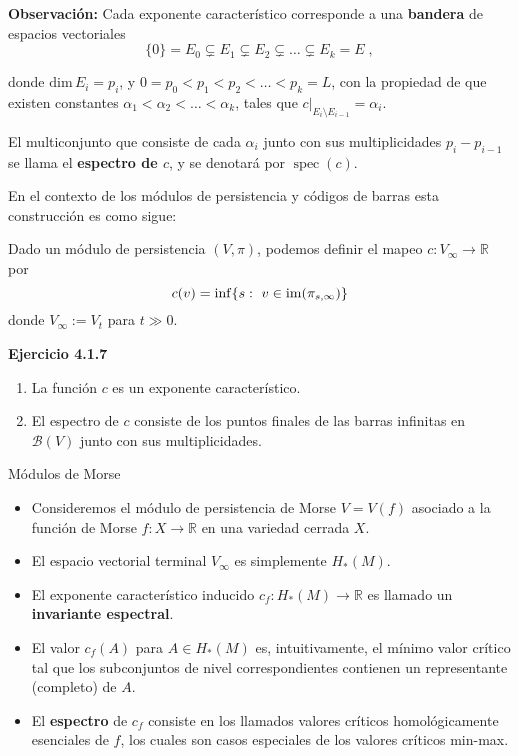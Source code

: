 \documentclass{beamer}
\newcounter{Ejercicio}
\DeclareMathOperator{\spec}{spec}
\newcommand{\calB}{{\mathcal{B}}}
\newcommand{\setm}{\setminus}
\newcommand{\restr}{\big|}  %
\def\R{\mathbb{R}}
\def \dim{{\mbox {dim}}\,}
\begin{document}
\begin{frame}{}
 \textbf{{\color{yellow}Observación:}}   Cada exponente característico corresponde a una \textbf{{\color{green}bandera}} de espacios vectoriales
$$
	\{0\} = E_0 \subsetneq E_1 \subsetneq E_2 \subsetneq \ldots \subsetneq E_k = E \;,
$$

donde $\dim E_i = p_i$, y $0= p_0 <p_1 < p_2 <\ldots < p_k = L$, con la propiedad de que existen constantes $\alpha_1 < \alpha_2 < \ldots < \alpha_k$, tales que 
$c\restr_{E_i\setm E_{i-1}} = \alpha_i$. \\[0.5cm]\pause

El multiconjunto que consiste de cada $\alpha_i$ junto con sus multiplicidades $p_i - p_{i-1}$ se llama el \textbf{{\color{green}espectro de $c$}}, y se denotará por $\spec (c)$.

\end{frame}

\begin{frame}{}

En el contexto de los módulos de persistencia y códigos de barras esta construcción es como sigue: \pause

Dado un módulo de persistencia $(V, \pi)$, podemos definir el mapeo $c: V_{\infty} \to \R$ por
	$$c(v) = \inf \{ s:\ v\in {\operatorname{im}}(\pi_{s, \infty})\}$$
donde $V_\infty := V_t$ para $t \gg 0$.\\[0.5cm] \pause

\textbf{{\color{violet}Ejercicio 4.1.7}}
	\begin{enumerate}
		\item
			La función $c$ es un exponente característico.
		\item
			El espectro de $c$ consiste de los puntos finales de las barras infinitas en $\calB (V)$ junto con sus multiplicidades.
	\end{enumerate}
\end{frame}

\begin{frame}{Módulos de Morse}
\begin{itemize}
    \item Consideremos el módulo de persistencia de Morse $V=V(f)$ asociado a la función de Morse $f : X \to \R$ en una variedad cerrada $X$. \\[0.5cm] \pause
    \item El espacio vectorial terminal $V_\infty$ es simplemente $H_*(M)$. \pause 
    \item El exponente característico inducido $c_f \colon H_*(M) \to \R$ es llamado un \textbf{{\color{green}invariante espectral}}. \\[0.5cm]\pause
    \item El valor $c_f(A)$ para $A \in H_*(M)$ es, intuitivamente, el mínimo valor crítico tal que los subconjuntos de nivel correspondientes contienen un representante (completo) de $A$. \\[0.5cm] \pause 
    \item El \textbf{{\color{green}espectro}} de $c_f$ consiste en los llamados valores críticos homológicamente esenciales de $f$, los cuales son casos especiales de los valores críticos min-max.
\end{itemize}
\end{frame}
\end{document}
